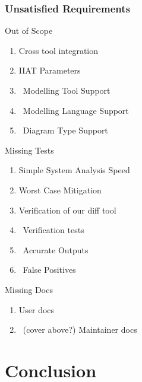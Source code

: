 \documentclass[11pt]{article}
\begin{document}
    \subsubsection{Unsatisfied Requirements} \label{subsubsec:unsat-reqs}
    Out of Scope
    \begin{enumerate}
        \item Cross tool integration
        \item IIAT Parameters
        \item ~Modelling Tool Support
        \item ~Modelling Language Support
        \item ~Diagram Type Support
    \end{enumerate}
    Missing Tests
    \begin{enumerate}
        \item Simple System Analysis Speed
        \item Worst Case Mitigation
        \item Verification of our diff tool
        \item ~Verification tests
        \item ~Accurate Outputs
        \item ~False Positives
    \end{enumerate}
    Missing Docs %
    \begin{enumerate}
        \item User docs
        \item ~(cover above?) Maintainer docs
    \end{enumerate}

    \section{Conclusion}\label{sec:conclusion}
    
\end{document}
